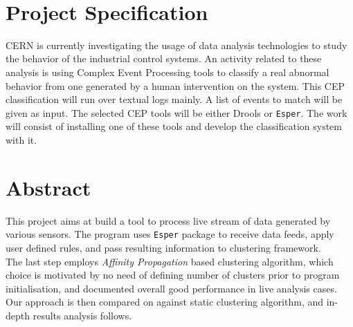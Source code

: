 \documentclass[11pt, letterpaper]{article}            %
\newcommand{\footrulecolor}[1]{\patchcmd{\footrule}{\hrule}{\color{#1}\hrule}{}{}} %
\begin{document}
~
\thispagestyle{empty}\newpage

\section*{Project Specification}
CERN is currently investigating the usage of data analysis technologies to study the behavior of the industrial control systems. An activity related to these analysis is using Complex Event Processing tools to classify a real abnormal behavior from one generated by a human intervention on the system. This CEP classification will run over textual logs mainly. A list of events to match will be given as input. The selected CEP tools will be either Drools or \texttt{Esper}. The work will consist of installing one of these tools and develop the classification system with it.
\newpage

\section*{Abstract}
This project aims at build a tool to process live stream of data generated by various sensors. The program uses \texttt{Esper} package to receive data feeds, apply user defined rules, and pass resulting information to clustering framework.\\
The last step employs \emph{Affinity Propagation} based clustering algorithm, which choice is motivated by no need of defining number of clusters prior to program initialisation, and documented overall good performance in live analysis cases.\\
Our approach is then compared on against static clustering algorithm, and in-depth results analysis follows.
\newpage

{\fontsize{11}{13}\sffamily\linespread{1.750}\selectfont\tableofcontents}
\thispagestyle{fancy}\newpage

\fancyfoot{} %
\renewcommand{\footrulewidth}{0.4pt} %
\footrulecolor{linec}
\end{document}
